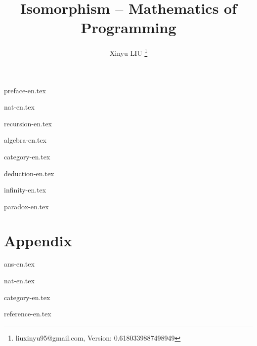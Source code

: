 \documentclass[b5paper, twoside, table]{book}
\begin{document}



\title{
  {\bf \Huge Isomorphism \newline}
  \vspace{5mm}
  {\bf -- Mathematics of Programming \newline \newline \newline}
  \centering
}

\author{Xinyu LIU
  \thanks{ liuxinyu95@gmail.com, Version: 0.6180339887498949}
}

\maketitle

\frontmatter
{preface-en.tex}
\newpage

\tableofcontents

\mainmatter

{nat-en.tex}

{recursion-en.tex}

{algebra-en.tex}

{category-en.tex}

{deduction-en.tex}

{infinity-en.tex}

{paradox-en.tex}

\part*{Appendix}
\appendix
\noappendicestocpagenum
\addappheadtotoc

\backmatter
{ans-en.tex}

{nat-en.tex}

{category-en.tex}

{reference-en.tex}

\printindex


\end{document}
